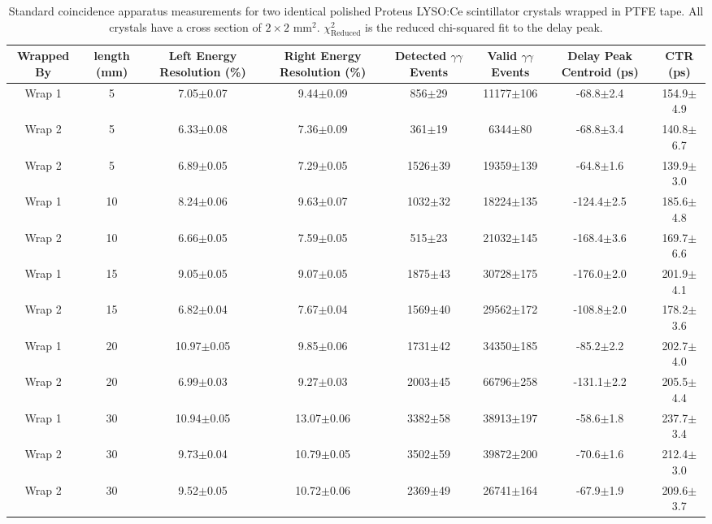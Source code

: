 \begin{table}
\caption{\label{tab:standardctr} Standard coincidence apparatus measurements for two identical polished Proteus LYSO:Ce scintillator crystals wrapped in PTFE tape. All crystals have a cross section of $2\times2$ mm$^2$. $\chi^2_\text{Reduced}$ is the reduced chi-squared fit to the delay peak.}
\begin{tabular}{cccccccc}
\hline
Wrapped By &  length (mm) & Left Energy Resolution (\%) & Right Energy Resolution (\%) & Detected $\gamma\gamma$ Events & Valid $\gamma\gamma$ Events & Delay Peak Centroid (ps) & CTR (ps)\\
\hline
    Wrap 1 &      5 &   7.05$\pm$0.07 &   9.44$\pm$0.09 &   856$\pm$29 &  11177$\pm$106 &   -68.8$\pm$2.4 &  154.9$\pm$4.9 \\
    Wrap 2 &      5 &   6.33$\pm$0.08 &   7.36$\pm$0.09 &   361$\pm$19 &    6344$\pm$80 &   -68.8$\pm$3.4 &  140.8$\pm$6.7 \\
    Wrap 2 &      5 &   6.89$\pm$0.05 &   7.29$\pm$0.05 &  1526$\pm$39 &  19359$\pm$139 &   -64.8$\pm$1.6 &  139.9$\pm$3.0 \\
    Wrap 1 &     10 &   8.24$\pm$0.06 &   9.63$\pm$0.07 &  1032$\pm$32 &  18224$\pm$135 &  -124.4$\pm$2.5 &  185.6$\pm$4.8 \\
    Wrap 2 &     10 &   6.66$\pm$0.05 &   7.59$\pm$0.05 &   515$\pm$23 &  21032$\pm$145 &  -168.4$\pm$3.6 &  169.7$\pm$6.6 \\
    Wrap 1 &     15 &   9.05$\pm$0.05 &   9.07$\pm$0.05 &  1875$\pm$43 &  30728$\pm$175 &  -176.0$\pm$2.0 &  201.9$\pm$4.1 \\
    Wrap 2 &     15 &   6.82$\pm$0.04 &   7.67$\pm$0.04 &  1569$\pm$40 &  29562$\pm$172 &  -108.8$\pm$2.0 &  178.2$\pm$3.6 \\
    Wrap 1 &     20 &  10.97$\pm$0.05 &   9.85$\pm$0.06 &  1731$\pm$42 &  34350$\pm$185 &   -85.2$\pm$2.2 &  202.7$\pm$4.0 \\
    Wrap 2 &     20 &   6.99$\pm$0.03 &   9.27$\pm$0.03 &  2003$\pm$45 &  66796$\pm$258 &  -131.1$\pm$2.2 &  205.5$\pm$4.4 \\
    Wrap 1 &     30 &  10.94$\pm$0.05 &  13.07$\pm$0.06 &  3382$\pm$58 &  38913$\pm$197 &   -58.6$\pm$1.8 &  237.7$\pm$3.4 \\
    Wrap 2 &     30 &   9.73$\pm$0.04 &  10.79$\pm$0.05 &  3502$\pm$59 &  39872$\pm$200 &   -70.6$\pm$1.6 &  212.4$\pm$3.0 \\
    Wrap 2 &     30 &   9.52$\pm$0.05 &  10.72$\pm$0.06 &  2369$\pm$49 &  26741$\pm$164 &   -67.9$\pm$1.9 &  209.6$\pm$3.7 \\
\hline
\end{tabular}
\end{table}


